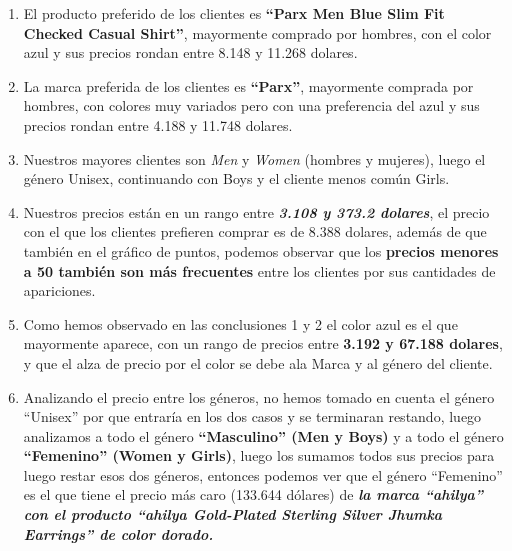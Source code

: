 \documentclass[
]{article}
\begin{document}
\begin{enumerate}
\def\labelenumi{\arabic{enumi}.}
\item
  El producto preferido de los clientes es \textbf{``Parx Men Blue Slim
  Fit Checked Casual Shirt''}, mayormente comprado por hombres, con el
  color azul y sus precios rondan entre 8.148 y 11.268 dolares.
\item
  La marca preferida de los clientes es \textbf{``Parx''}, mayormente
  comprada por hombres, con colores muy variados pero con una
  preferencia del azul y sus precios rondan entre 4.188 y 11.748
  dolares.
\item
  Nuestros mayores clientes son \emph{Men} y \emph{Women} (hombres y
  mujeres), luego el género Unisex, continuando con Boys y el cliente
  menos común Girls.
\item
  Nuestros precios están en un rango entre \textbf{\emph{3.108 y 373.2
  dolares}}, el precio con el que los clientes prefieren comprar es de
  8.388 dolares, además de que también en el gráfico de puntos, podemos
  observar que los \textbf{precios menores a 50 también son más
  frecuentes} entre los clientes por sus cantidades de apariciones.
\item
  Como hemos observado en las conclusiones 1 y 2 el color azul es el que
  mayormente aparece, con un rango de precios entre \textbf{3.192 y
  67.188 dolares}, y que el alza de precio por el color se debe ala
  Marca y al género del cliente.
\item
  Analizando el precio entre los géneros, no hemos tomado en cuenta el
  género ``Unisex'' por que entraría en los dos casos y se terminaran
  restando, luego analizamos a todo el género \textbf{``Masculino'' (Men
  y Boys)} y a todo el género \textbf{``Femenino'' (Women y Girls)},
  luego los sumamos todos sus precios para luego restar esos dos
  géneros, entonces podemos ver que el género ``Femenino'' es el que
  tiene el precio más caro (133.644 dólares) de \textbf{\emph{la marca
  ``ahilya'' con el producto ``ahilya Gold-Plated Sterling Silver Jhumka
  Earrings'' de color dorado.}}
\end{enumerate}
\end{document}
